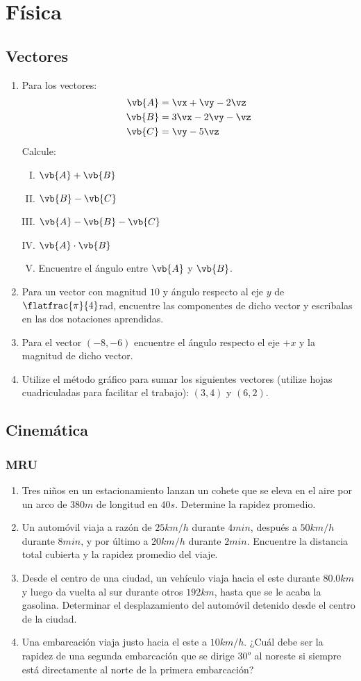 \section{Física}
\subsection{Vectores}
\begin{enumerate}
	\item Para los vectores:
	\begin{align*}
		\vb{A} &= \vx + \vy - 2\vz \\
		\vb{B} &= 3\vx - 2\vy - \vz \\
		\vb{C} &= \vy - 5\vz
	\end{align*}
Calcule:
	\begin{enumerate}[I)]
		\item $\vb{A} + \vb{B}$
		\item $\vb{B} - \vb{C}$
		\item $\vb{A} - \vb{B} - \vb{C}$
		\item $\vb{A} \cdot \vb{B}$
		\item Encuentre el ángulo entre $\vb{A}$ y $\vb{B}$. 
	\end{enumerate}
	\item Para un vector con magnitud $10$ y ángulo respecto al eje $y$ de $\flatfrac{\pi}{4}$rad, encuentre las componentes de dicho vector y escribalas en las dos notaciones aprendidas.
	\item Para el vector $(-8,-6)$ encuentre el ángulo respecto el eje $+x$ y la magnitud de dicho vector.
	\item Utilize el método gráfico para sumar los siguientes vectores (utilize hojas cuadriculadas para facilitar el trabajo): $(3,4)$ y $(6,2)$.
\end{enumerate}

\subsection{Cinemática}
\subsubsection{MRU}
	\begin{enumerate}
		\item Tres niños en un estacionamiento lanzan un cohete que se eleva en el aire por un arco de $380 m$ de longitud en $40 s$.
Determine la rapidez promedio.
		\item Un automóvil viaja a razón de $25km/h$ durante $4min$, después a $50km/h$ durante $8min$, y por último a $20km/h$ durante $2min$. Encuentre la distancia total cubierta y la rapidez promedio del viaje.
		\item Desde el centro de una ciudad, un vehículo viaja hacia el este durante $80.0 km$ y luego da vuelta al sur durante otros
$192 km$, hasta que se le acaba la gasolina. Determinar el desplazamiento del automóvil detenido desde el centro de la
ciudad.
		\item Una embarcación viaja justo hacia el este a $10 km / h$. ¿Cuál debe ser la rapidez de una segunda embarcación que se
dirige $30^o$ al noreste si siempre está directamente al norte de la primera embarcación?
	\end{enumerate}
